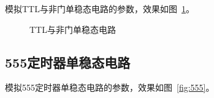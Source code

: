 \documentclass[a4paper,twoside]{ctexart}
\begin{document}
\begin{spacing}{1.2}
模拟TTL与非门单稳态电路的参数，效果如图~\ref{fig:ttl}。

\begin{figure}[htbp]
	\centering
	\caption{TTL与非门单稳态电路}
	\label{fig:ttl}
\end{figure}

\subsection{555定时器单稳态电路}

模拟555定时器单稳态电路的参数，效果如图~\ref{fig:555}。


\end{spacing}
\end{document}
